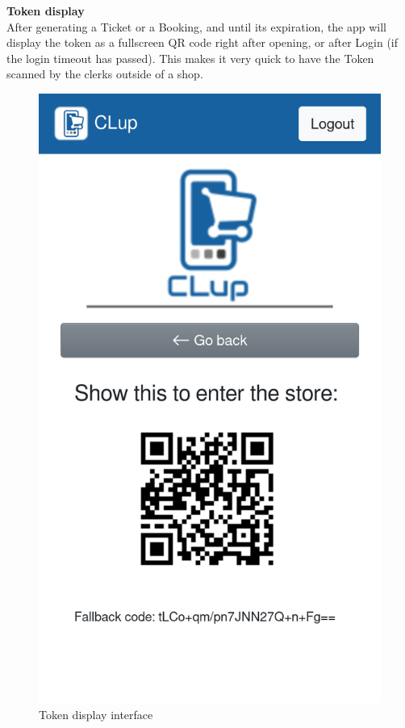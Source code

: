 \textbf{Token display}\\
\label{page:token_show}
After generating a Ticket or a Booking, and until its expiration, the app will display the token as a fullscreen QR code right after opening, or after Login (if the login timeout has passed).
This makes it very quick to have the Token scanned by the clerks outside of a shop.
\begin{figure}[H]
    \centering
    \includegraphics[scale=0.25]{Images/token-mockup.png}
    \caption{Token display interface}
\end{figure}

